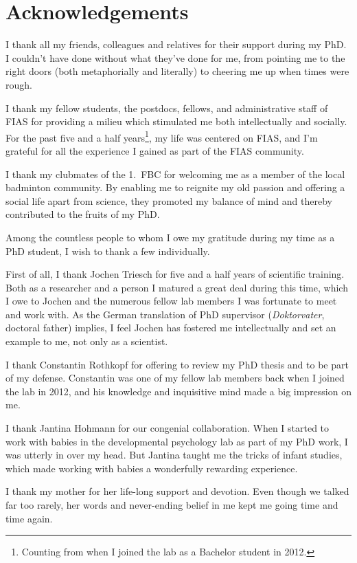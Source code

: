 \documentclass[a4paper]{scrreprt}
\begin{document}
\clearpage
\chapter*{Acknowledgements}
I thank all my friends, colleagues and relatives for their support during my PhD. I couldn't have done without what they've done for me, from pointing me to the right doors (both metaphorially and literally) to cheering me up when times were rough.

I thank my fellow students, the postdocs, fellows, and administrative staff of FIAS for providing a milieu which stimulated me both intellectually and socially. For the past five and a half years\footnote{Counting from when I joined the lab as a Bachelor student in 2012.}, my life was centered on FIAS, and I'm grateful for all the experience I gained as part of the FIAS community.

I thank my clubmates of the 1.~FBC for welcoming me as a member of the local badminton community. By enabling me to reignite my old passion and offering a social life apart from science, they promoted my balance of mind and thereby contributed to the fruits of my PhD.

Among the countless people to whom I owe my gratitude during my time as a PhD student, I wish to thank a few individually.

First of all, I thank Jochen Triesch for five and a half years of scientific training. Both as a researcher and a person I matured a great deal during this time, which I owe to Jochen and the numerous fellow lab members I was fortunate to meet and work with. As the German translation of PhD supervisor (\emph{Doktorvater}, doctoral father) implies, I feel Jochen has fostered me intellectually and set an example to me, not only as a scientist.

I thank Constantin Rothkopf for offering to review my PhD thesis and to be part of my defense. Constantin was one of my fellow lab members back when I joined the lab in 2012, and his knowledge and inquisitive mind made a big impression on me.

I thank Jantina Hohmann for our congenial collaboration. When I started to work with babies in the developmental psychology lab as part of my PhD work, I was utterly in over my head. But Jantina taught me the tricks of infant studies, which made working with babies a wonderfully rewarding experience.

I thank my mother for her life-long support and devotion. Even though we talked far too rarely, her words and never-ending belief in me kept me going time and time again.
\end{document}
